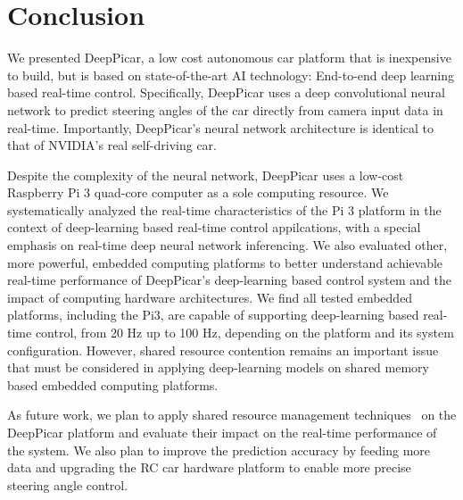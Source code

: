 \section{Conclusion}\label{sec:conclusion}
We presented DeepPicar, a low cost autonomous car platform that is
inexpensive to build, but is based on state-of-the-art AI technology:
End-to-end deep learning based real-time control.
Specifically, DeepPicar uses a deep convolutional neural network to
predict steering angles of the car directly from camera input data
in real-time. Importantly, DeepPicar's neural network architecture is
identical to that of NVIDIA's real self-driving car. 

Despite the complexity of the neural network, DeepPicar uses a
low-cost Raspberry Pi 3 quad-core computer as a sole computing
resource. We systematically analyzed the real-time characteristics of
the Pi 3 platform in the context of deep-learning based real-time
control appilcations, with a special emphasis on real-time deep neural
network inferencing.
We also evaluated other, more powerful, embedded computing
platforms to better understand achievable real-time performance of
DeepPicar's deep-learning based control system and the impact of
computing hardware architectures.
We find all tested embedded platforms, including the Pi3, are capable
of supporting deep-learning based real-time control, from 20 Hz up to
100 Hz, depending on the platform and its system
configuration. However, shared resource contention remains an
important issue that must be considered in applying deep-learning
models on shared memory based embedded computing platforms.

As future work, we plan to apply shared resource management
techniques~\cite{Yun2013,yun2014rtas} on the DeepPicar platform and
evaluate their impact on the real-time performance of the system. We
also plan to improve the prediction accuracy by feeding more data and
upgrading the RC car hardware platform to enable more precise steering
angle control.
